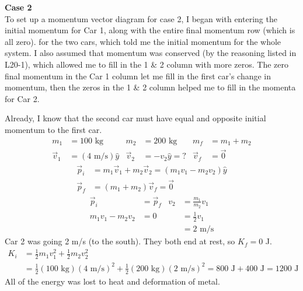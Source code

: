 \documentclass[]{article}
\begin{document}
\newpage
\begin{TeacherMargin}
\noindent\textbf{Case 2} \\
To set up a momentum vector diagram for case 2, I began with entering the initial momentum for Car 1, along with the entire final momentum row (which is all zero). for the two cars, which told me the initial momentum for the whole system. I also assumed that momentum was conserved (by the reasoning listed in L20-1), which allowed me to fill in the 1 \& 2 column with more zeros. The zero final momentum in the Car 1 column let me fill in the first car's change in momentum, then the zeros in the 1 \& 2 column helped me to fill in the momenta for Car 2.
\begin{center}
	\Large
\end{center}
Already, I know that the second car must have equal and opposite initial momentum to the first car.
\begin{align*}
	m_{1} & = 100\text{ kg} & m_{2} & = 200\text{ kg} & m_{f} & = m_{1}+m_{2} \\
	\vec{v}_{1} & = (4\text{ m/s})\hat{y} & \vec{v}_{2} & = -v_{2}\hat{y} = ? & \vec{v}_{f} & = \vec{0}
\end{align*}
\begin{align*}
	\vec{p}_{i} & = m_{1}\vec{v}_{1} + m_{2}\vec{v}_{2} = (m_{1}v_{1}-m_{2}v_{2})\hat{y} \\
	\vec{p}_{f} & = (m_{1} + m_{2})\vec{v}_{f} = \vec{0}
\end{align*}
\begin{align*}
	\vec{p}_{i} & = \vec{p}_{f} & v_{2} & = \frac{m_{1}}{m_{2}}v_{1} \\
	m_{1}v_{1} - m_{2}v_{2} & = 0 &  & = \frac{1}{2}v_{1} \\
	& & & = 2\text{ m/s}
\end{align*}
Car 2 was going 2 m/s (to the south). They both end at rest, so $K_{f}=0$ J.
\begin{align*}
	K_{i} & = \frac{1}{2}m_{1}v_{1}^{2} + \frac{1}{2}m_{2}v_{2}^{2} \\
	& = \frac{1}{2}(100\text{ kg})(4\text{ m/s})^{2} + \frac{1}{2}(200\text{ kg})(2\text{ m/s})^{2} = 800\text{ J} + 400\text{ J} = 1200\text{ J}
\end{align*}
All of the energy was lost to heat and deformation of metal.
\end{TeacherMargin}
\end{document}
